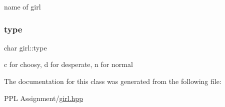 name of girl \mbox{\label{classgirl_a65688d401c88cfaa9632d4f7758f02d1}} 
\subsubsection{\texorpdfstring{type}{type}}
{\footnotesize\ttfamily char girl\+::type}

\textquotesingle{}c\textquotesingle{} for choosy, \textquotesingle{}d\textquotesingle{} for desperate, \textquotesingle{}n\textquotesingle{} for normal 

The documentation for this class was generated from the following file\+:\begin{DoxyCompactItemize}
\item 
P\+P\+L Assignment/\hyperlink{girl_8hpp}{girl.\+hpp}\end{DoxyCompactItemize}
